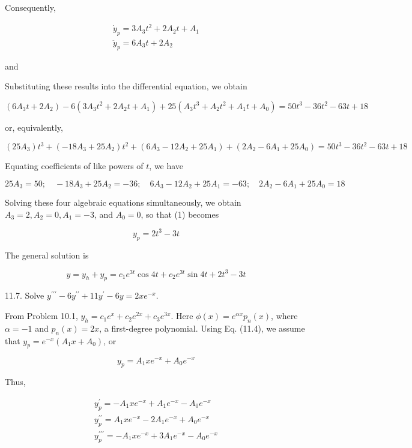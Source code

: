 \documentclass[10pt]{article}
\begin{document}
Consequently,

$$
\begin{gathered}
\dot{y}_{p}=3 A_{3} t^{2}+2 A_{2} t+A_{1} \\
\ddot{y}_{p}=6 A_{3} t+2 A_{2}
\end{gathered}
$$

and

Substituting these results into the differential equation, we obtain

$$
\left(6 A_{3} t+2 A_{2}\right)-6\left(3 A_{3} t^{2}+2 A_{2} t+A_{1}\right)+25\left(A_{3} t^{3}+A_{2} t^{2}+A_{1} t+A_{0}\right)=50 t^{3}-36 t^{2}-63 t+18
$$

or, equivalently,

$$
\left(25 A_{3}\right) t^{3}+\left(-18 A_{3}+25 A_{2}\right) t^{2}+\left(6 A_{3}-12 A_{2}+25 A_{1}\right)+\left(2 A_{2}-6 A_{1}+25 A_{0}\right)=50 t^{3}-36 t^{2}-63 t+18
$$

Equating coefficients of like powers of $t$, we have

$$
25 A_{3}=50 ; \quad-18 A_{3}+25 A_{2}=-36 ; \quad 6 A_{3}-12 A_{2}+25 A_{1}=-63 ; \quad 2 A_{2}-6 A_{1}+25 A_{0}=18
$$

Solving these four algebraic equations simultaneously, we obtain $A_{3}=2, A_{2}=0, A_{1}=-3$, and $A_{0}=0$, so that (1) becomes

$$
y_{p}=2 t^{3}-3 t
$$

The general solution is

$$
y=y_{h}+y_{p}=c_{1} e^{3 t} \cos 4 t+c_{2} e^{3 t} \sin 4 t+2 t^{3}-3 t
$$

11.7. Solve $y^{\prime \prime \prime}-6 y^{\prime \prime}+11 y^{\prime}-6 y=2 x e^{-x}$.

From Problem 10.1, $y_{h}=c_{1} e^{x}+c_{2} e^{2 x}+c_{3} e^{3 x}$. Here $\phi(x)=e^{\alpha x} p_{n}(x)$, where $\alpha=-1$ and $p_{n}(x)=2 x$, a first-degree polynomial. Using Eq. (11.4), we assume that $y_{p}=e^{-x}\left(A_{1} x+A_{0}\right)$, or


\begin{equation*}
y_{p}=A_{1} x e^{-x}+A_{0} e^{-x} \tag{1}
\end{equation*}


Thus,

$$
\begin{gathered}
y_{p}^{\prime}=-A_{1} x e^{-x}+A_{1} e^{-x}-A_{0} e^{-x} \\
y_{p}^{\prime \prime}=A_{1} x e^{-x}-2 A_{1} e^{-x}+A_{0} e^{-x} \\
y_{p}^{\prime \prime \prime}=-A_{1} x e^{-x}+3 A_{1} e^{-x}-A_{0} e^{-x}
\end{gathered}
$$
\end{document}
